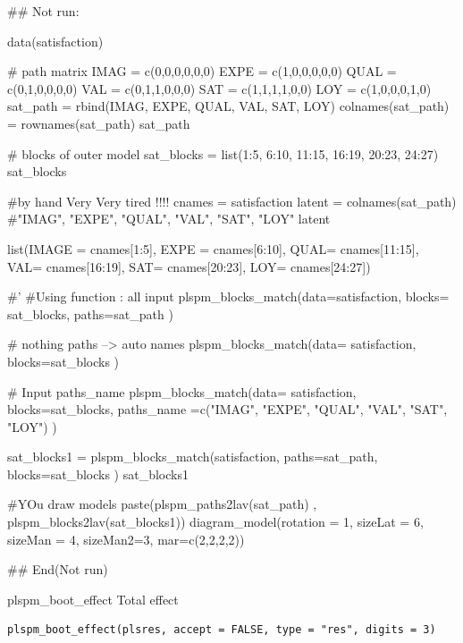 \documentclass[a4paper]{book}
\begin{document}
\begin{Examples}
\begin{ExampleCode}

## Not run: 

data(satisfaction)


# path matrix
IMAG = c(0,0,0,0,0,0)
EXPE = c(1,0,0,0,0,0)
QUAL = c(0,1,0,0,0,0)
VAL = c(0,1,1,0,0,0)
SAT = c(1,1,1,1,0,0)
LOY = c(1,0,0,0,1,0)
sat_path = rbind(IMAG, EXPE, QUAL, VAL, SAT, LOY)
colnames(sat_path) = rownames(sat_path)
sat_path

# blocks of outer model
sat_blocks = list(1:5, 6:10, 11:15, 16:19, 20:23, 24:27)
sat_blocks


#by hand Very Very tired !!!!
cnames = satisfaction%
latent = colnames(sat_path) #"IMAG", "EXPE", "QUAL", "VAL",  "SAT",  "LOY"
latent

list(IMAGE = cnames[1:5],
     EXPE = cnames[6:10],
     QUAL= cnames[11:15],
     VAL= cnames[16:19],
     SAT= cnames[20:23],
     LOY= cnames[24:27])

#' #Using function : all input
plspm_blocks_match(data=satisfaction, blocks= sat_blocks, paths=sat_path )

# nothing paths --> auto names
plspm_blocks_match(data= satisfaction, blocks=sat_blocks )

# Input paths_name
plspm_blocks_match(data= satisfaction, blocks=sat_blocks,
                   paths_name =c("IMAG", "EXPE", "QUAL", "VAL",  "SAT",  "LOY") )


sat_blocks1 = plspm_blocks_match(satisfaction, paths=sat_path, blocks=sat_blocks )
sat_blocks1

#YOu draw models
paste(plspm_paths2lav(sat_path) ,
      plspm_blocks2lav(sat_blocks1))%
  diagram_model(rotation = 1, sizeLat = 6, sizeMan = 4, sizeMan2=3,
                mar=c(2,2,2,2))

## End(Not run)

\end{ExampleCode}
\end{Examples}
%
\begin{Description}
plspm\_boot\_effect Total effect
\end{Description}
%
\begin{Usage}
\begin{verbatim}
plspm_boot_effect(plsres, accept = FALSE, type = "res", digits = 3)
\end{verbatim}
\end{Usage}
\end{document}
